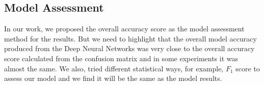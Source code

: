 \subsection{Model Assessment}

In our work, we proposed the overall accuracy score as the model assessment method for the results. But we need to highlight that the overall model accuracy produced from the Deep Neural Networks was very close to the overall accuracy score calculated from the confusion matrix and in some experiments it was almost the same. We also, tried different statistical ways, for example, $F_1$ score to assess our model and we find it will be the same as the model results.


